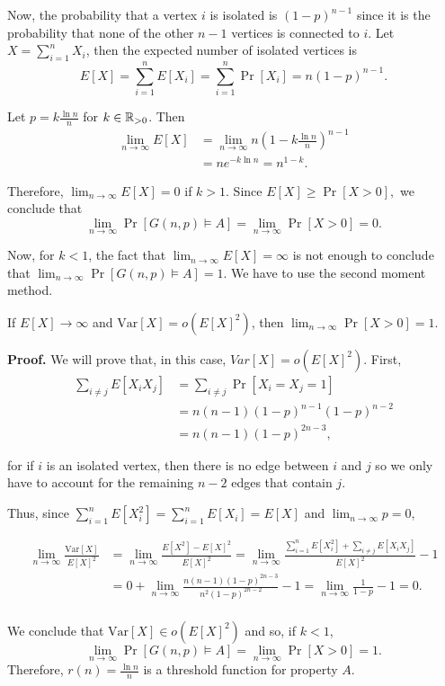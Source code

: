 Now, the probability that a vertex $i$ is isolated is $(1 - p)^{n - 1}$ since it is the probability that none of the other $n - 1$ vertices is connected to $i$. Let $X = \sum_{i = 1}^n X_i$, then the expected number of isolated vertices is
 \[E[X] = \sum_{i = 1}^{n} E[X_i] = \sum_{i = 1}^{n} \Pr[X_i] = n(1 - p)^{n - 1}.\]

Let $\displaystyle{p = k\frac{\ln n}{n}}$ for $k \in \mathbb{R}_{>0}$. Then
\begin{align*}
    \lim_{n \to \infty} E[X] &= \lim_{n \to \infty} n\left(1 - k\frac{\ln n}{n}\right)^{n - 1} \\
    &= ne^{-k\ln n} = n^{1 - k}.
\end{align*}

Therefore, $\lim_{n \to \infty} E[X] = 0$ if $k > 1$. Since \(E[X] \geq \Pr[X > 0],\) we conclude that \[\lim_{n \to \infty} \Pr[G(n, p) \vDash A] =  \lim_{n \to \infty} \Pr[X > 0] = 0.\] \par
Now, for $k < 1$, the fact that $\lim_{n \to \infty} E[X] = \infty$ is not enough to conclude that \(\lim_{n \to \infty} \Pr[G(n, p) \vDash A] = 1\). We have to use the second moment method. \par

\begin{theorem*}
    If $E[X] \to \infty$ and $\text{Var}[X] = o(E[X]^2)$, then $\lim_{n \to \infty} \Pr[X > 0] = 1$. \cite{alon2016probabilistic}
\end{theorem*}

\textbf{Proof. } We will prove that, in this case, $Var[X] = o(E[X]^2)$. First, 
\begin{align*}
    \sum_{i \neq j}E[X_iX_j] &= \sum_{i \neq j} \Pr[X_i = X_j = 1] \\
    &= n(n - 1)(1 - p)^{n -1}(1 - p)^{n - 2} \\ &= n(n - 1)(1 - p)^{2n - 3},
\end{align*}

for if $i$ is an isolated vertex, then there is no edge between $i$ and $j$ so we only have to account for the remaining $n - 2$ edges that contain $j$.  \par

Thus, since $\sum_{i = 1}^{n}E[X_i^2] =  \sum_{i = 1}^n E[X_i] = E[X]$ and $\lim_{n \to \infty} p = 0$,

\begin{align*}
    \lim_{n \to \infty} \frac{\text{Var}[X]}{E[X]^2} &= 
    \lim_{n \to \infty}\frac{E[X^2] - E[X]^2}{E[X]^2} = \lim_{n \to \infty} \frac{\sum_{i = 1}^n E[X_i^2] + \sum_{i \neq j}E[X_iX_j]}{E[X]^2} - 1 \\ &= 0 + \lim_{n \to \infty} \frac{ n(n - 1)(1 - p)^{2n - 3}}{n^2(1 - p)^{2n - 2}} - 1= \lim_{n \to \infty} \frac{1}{1 - p} - 1 = 0.\\
\end{align*} \par
We conclude that $\text{Var}[X] \in o(E[X]^2)$ and so, if $k < 1$, \[\lim_{n \to \infty} \Pr[G(n, p) \vDash A] = \lim_{n \to \infty} \Pr[X > 0] = 1.\] Therefore, $r(n) = \frac{\ln n}{n}$ is a threshold function for property $A$.
